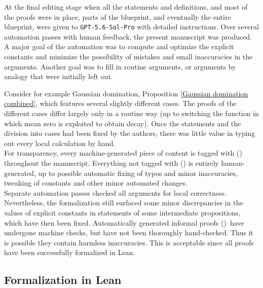 \documentclass[12pt,reqno]{amsart}
\newcommand{\auto}{{({\tiny\faCar})}}
\theoremstyle{plain}
\numberwithin{equation}{section}
\theoremstyle{remark}
\begin{document}
At the final editing stage when all the statements and definitions, and most of the proofs were in place, parts of the blueprint, and eventually the entire blueprint, were given to \texttt{GPT-5.6-Sol-Pro} with detailed instructions. Over several automation passes with human feedback, the present manuscript was produced.
A major goal of the automation was to compute and optimize the explicit constants and minimize the possibility of mistakes and small inaccuracies in the arguments.
Another goal was to fill in routine arguments, or arguments by analogy that were initially left out.

Consider for example Gaussian domination, Proposition \ref{Gaussian domination combined}, which features several slightly different cases. The proofs of the different cases differ largely only in a routine way (up to switching the function in which mean zero is exploited to obtain decay). Once the statements and the division into cases had been fixed by the authors, there was little value in typing out every local calculation by hand.\\

For transparency, every machine-generated piece of content is tagged with \auto\; throughout the manuscript. Everything not tagged with \auto\; is entirely human-generated, up to possible automatic fixing of typos and minor inaccuracies, tweaking of constants and other minor automated changes.\\

Separate automation passes checked all arguments for local correctness. %
Nevertheless, the formalization still surfaced some minor discrepancies in the values of explicit constants in statements of some intermediate propositions, which have then been fixed. Automatically generated informal proofs \auto\, have undergone machine checks, but have not been thoroughly hand-checked. Thus it is possible they contain harmless inaccuracies. This is acceptable since all proofs have been successfully formalized in Lean.

\subsection{Formalization in Lean}
\end{document}
